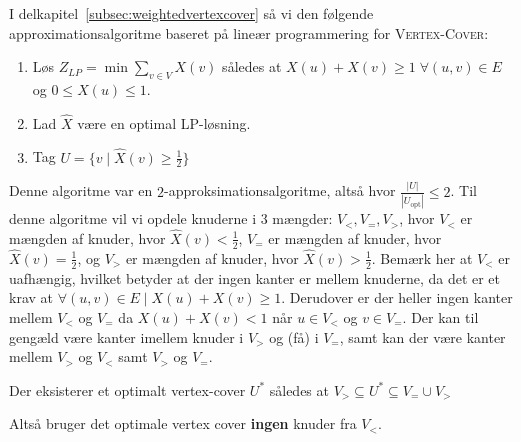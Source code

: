 I delkapitel~\ref{subsec:weightedvertexcover} så vi den følgende approximationsalgoritme baseret på lineær programmering for \textsc{Vertex-Cover}:
\begin{enumerate}
	\item Løs $Z_{LP} = \min \sum_{v \in V} X(v)$ således at $X(u)+X(v) \ge 1 \; \forall (u,v) \in E$ og $0 \le X(u) \le 1$.
	\item Lad $\hat{X}$ være en optimal LP-løsning.
	\item Tag $U = \{v \mid \hat{X}(v) \ge \frac{1}{2}\}$
\end{enumerate}

Denne algoritme var en $2$-approksimationsalgoritme, altså hvor $\frac{|U|}{|U_{\text{opt}}|} \le 2$. Til denne algoritme vil vi opdele knuderne i 3 mængder: $V_{<}, V_{=}, V_{>}$, hvor $V_{<}$ er mængden af knuder, hvor $\hat{X}(v) < \frac{1}{2}$, $V_{=}$ er mængden af knuder, hvor $\hat{X}(v) = \frac{1}{2}$, og $V_{>}$ er mængden af knuder, hvor $\hat{X}(v) > \frac{1}{2}$. Bemærk her at $V_{<}$ er uafhængig, hvilket betyder at der ingen kanter er mellem knuderne, da det er et krav at $\forall (u,v) \in E \mid X(u) + X(v) \ge 1$. Derudover er der heller ingen kanter mellem $V_{<}$ og $V_{=}$ da $X(u) + X(v) < 1$ når $u \in V_{<}$ og $v \in V_{=}$. Der kan til gengæld være kanter imellem knuder i $V_{>}$ og (få) i $V_{=}$, samt kan der være kanter mellem $V_{>}$ og $V_{<}$ samt $V_{>}$ og $V_{=}$.

\begin{theorem}
	Der eksisterer et optimalt vertex-cover $U^{*}$ således at $V_{>} \subseteq U^{*} \subseteq V_{=} \cup V_{>}$
\end{theorem}

Altså bruger det optimale vertex cover \textbf{ingen} knuder fra $V_{<}$.

